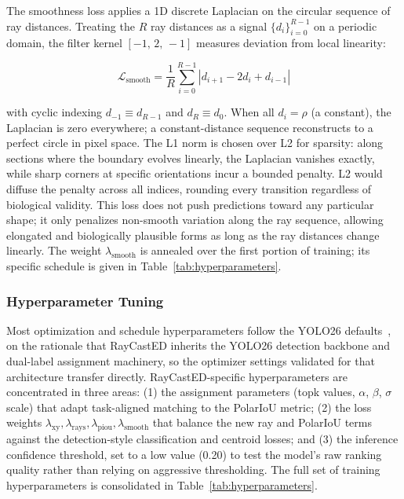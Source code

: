 The smoothness loss applies a 1D discrete Laplacian on the circular sequence of ray distances. Treating the $R$ ray distances as a signal $\{d_i\}_{i=0}^{R-1}$ on a periodic domain, the filter kernel $[-1,\, 2,\, -1]$ measures deviation from local linearity:

\begin{equation}
    \mathcal{L}_{\text{smooth}} = \frac{1}{R} \sum_{i=0}^{R-1} \left| d_{i+1} - 2d_i + d_{i-1} \right| 
\end{equation}

with cyclic indexing $d_{-1} \equiv d_{R-1}$ and $d_R \equiv d_0$. When all $d_i = \rho$ (a constant), the Laplacian is zero everywhere; a constant-distance sequence reconstructs to a perfect circle in pixel space. The L1 norm is chosen over L2 for sparsity: along sections where the boundary evolves linearly, the Laplacian vanishes exactly, while sharp corners at specific orientations incur a bounded penalty. L2 would diffuse the penalty across all indices, rounding every transition regardless of biological validity. This loss does not push predictions toward any particular shape; it only penalizes non-smooth variation along the ray sequence, allowing elongated and biologically plausible forms as long as the ray distances change linearly. The weight $\lambda_{\text{smooth}}$ is annealed over the first portion of training; its specific schedule is given in Table~\ref{tab:hyperparameters}.

\subsubsection{Hyperparameter Tuning}

Most optimization and schedule hyperparameters follow the YOLO26 defaults~\cite{sapkota2025yolo26}, on the rationale that RayCastED inherits the YOLO26 detection backbone and dual-label assignment machinery, so the optimizer settings validated for that architecture transfer directly. RayCastED-specific hyperparameters are concentrated in three areas: (1) the assignment parameters (topk values, $\alpha$, $\beta$, $\sigma$ scale) that adapt task-aligned matching to the PolarIoU metric; (2) the loss weights $\lambda_{\text{xy}}, \lambda_{\text{rays}}, \lambda_{\text{piou}}, \lambda_{\text{smooth}}$ that balance the new ray and PolarIoU terms against the detection-style classification and centroid losses; and (3) the inference confidence threshold, set to a low value (0.20) to test the model's raw ranking quality rather than relying on aggressive thresholding. The full set of training hyperparameters is consolidated in Table~\ref{tab:hyperparameters}.


